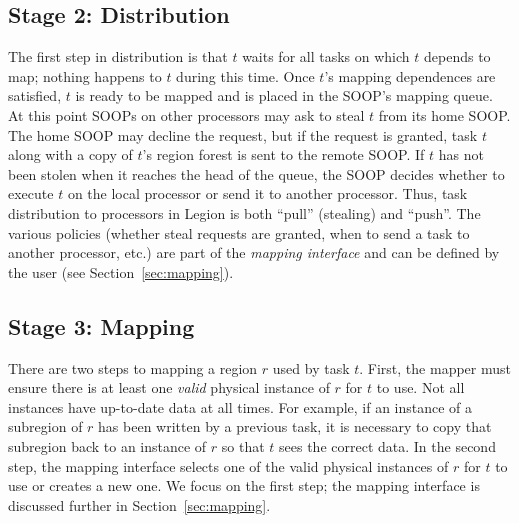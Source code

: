 \subsection{Stage 2: Distribution}
\label{sec:dist}

The first step in distribution is that $t$ waits for all tasks on which $t$ depends to
map; nothing happens to $t$ during this time.  Once $t$'s mapping
dependences are satisfied, $t$ is ready to be mapped and is placed
in the SOOP's mapping queue. At this point SOOPs on other processors may
ask to steal $t$ from its home SOOP.  The home SOOP may decline the
request, but if the request is granted, task $t$ along with a copy of
$t$'s region forest is sent to the remote SOOP.  If $t$ has not been
stolen when it reaches the head of the queue, the SOOP decides whether
to execute $t$ on the local processor or send it to another processor.
Thus, task distribution to processors in Legion is both ``pull'' (stealing) and ``push''.
The various policies (whether steal requests are granted, when to send
a task to another processor, etc.) are part of the {\em mapping interface}
and can be defined by the user (see Section~\ref{sec:mapping}).


\subsection{Stage 3: Mapping}
\label{sec:map}


There are two steps to mapping a region $r$ used by
task $t$.  First, the mapper must ensure there is at least one {\em valid}
physical instance of $r$ for $t$ to use.  Not all instances have up-to-date
data at all times.  For example, if an instance of a subregion of $r$ has been written by a previous task,
it is necessary to copy that subregion back to an instance of $r$ so that $t$
sees the correct data. In the second step, the mapping interface selects one of the
valid physical instances of $r$ for $t$ to use or creates a new one.  
We focus on the first step; the mapping interface is discussed further in Section~\ref{sec:mapping}.

